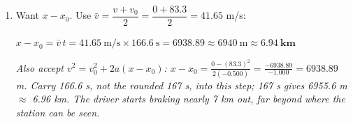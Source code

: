 \documentclass[12pt, twoside]{article}
\begin{document}
\begin{enumerate}[itemsep=0.5cm]
\begin{enumerate}[itemsep=0.3cm]
      $t = \dfrac{0 - 83.3~\text{m/s}}{-0.500~\text{m/s}^2} = 166.6
      \approx \mathbf{167~\textbf{s}}$

      \emph{About 2.8 minutes. The two negatives cancel, so the time comes out
      positive, as it must.}
    \item Want $x - x_0$. Use $\bar{v} = \dfrac{v + v_0}{2}
      = \dfrac{0 + 83.3}{2} = 41.65$ m/s:

      $x - x_0 = \bar{v}\,t = 41.65~\text{m/s} \times 166.6~\text{s} = 6938.89
      \approx 6940~\text{m} \approx \mathbf{6.94~\textbf{km}}$

      \emph{Also accept $v^2 = v_0^2 + 2a(x - x_0)$:
      $x - x_0 = \frac{0 - (83.3)^2}{2(-0.500)} = \frac{-6938.89}{-1.000}
      = 6938.89$ m. Carry 166.6 s, not the rounded 167 s, into this step; 167 s gives
      6955.6 m $\approx$ 6.96 km. The driver starts braking nearly 7 km out, far
      beyond where the station can be seen.}
  \end{enumerate}

\end{enumerate}
\end{document}
